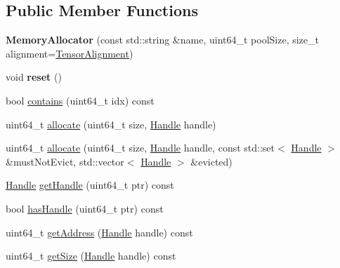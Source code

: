 \subsection*{Public Member Functions}
\begin{DoxyCompactItemize}
\item 
\mbox{\label{classglow_1_1_memory_allocator_ac7c2e3ca37155e4266b2f7104dc9aeab}} 
{\bfseries Memory\+Allocator} (const std\+::string \&name, uint64\+\_\+t pool\+Size, size\+\_\+t alignment=\hyperlink{namespaceglow_ad1e03f233498b5c733d2c0a68ffe2d57}{Tensor\+Alignment})
\item 
\mbox{\label{classglow_1_1_memory_allocator_a3217f7c2173403554b5f53c1eccb269b}} 
void {\bfseries reset} ()
\item 
bool \hyperlink{classglow_1_1_memory_allocator_a10a5be96f3d1ec9d09c911c841db3909}{contains} (uint64\+\_\+t idx) const
\item 
uint64\+\_\+t \hyperlink{classglow_1_1_memory_allocator_a8bd7c15304cb54909cbba8878ea57f7b}{allocate} (uint64\+\_\+t size, \hyperlink{classglow_1_1_memory_allocator_a8ebc21e1c9250f73f2e85aca3ae4ae9d}{Handle} handle)
\item 
uint64\+\_\+t \hyperlink{classglow_1_1_memory_allocator_a10636a2d9429529641393c60a8f2e4d5}{allocate} (uint64\+\_\+t size, \hyperlink{classglow_1_1_memory_allocator_a8ebc21e1c9250f73f2e85aca3ae4ae9d}{Handle} handle, const std\+::set$<$ \hyperlink{classglow_1_1_memory_allocator_a8ebc21e1c9250f73f2e85aca3ae4ae9d}{Handle} $>$ \&must\+Not\+Evict, std\+::vector$<$ \hyperlink{classglow_1_1_memory_allocator_a8ebc21e1c9250f73f2e85aca3ae4ae9d}{Handle} $>$ \&evicted)
\item 
\hyperlink{classglow_1_1_memory_allocator_a8ebc21e1c9250f73f2e85aca3ae4ae9d}{Handle} \hyperlink{classglow_1_1_memory_allocator_ab5938e2f0d2b448f0c2e11dad152ef8a}{get\+Handle} (uint64\+\_\+t ptr) const
\item 
bool \hyperlink{classglow_1_1_memory_allocator_a8148e0d8a4e2e2db2d3a01022a8ceaad}{has\+Handle} (uint64\+\_\+t ptr) const
\item 
uint64\+\_\+t \hyperlink{classglow_1_1_memory_allocator_a3bb026995b47d35fdb5dd4193249e705}{get\+Address} (\hyperlink{classglow_1_1_memory_allocator_a8ebc21e1c9250f73f2e85aca3ae4ae9d}{Handle} handle) const
\item 
uint64\+\_\+t \hyperlink{classglow_1_1_memory_allocator_a8357f913799b90d5c2279ac863f5a8c8}{get\+Size} (\hyperlink{classglow_1_1_memory_allocator_a8ebc21e1c9250f73f2e85aca3ae4ae9d}{Handle} handle) const

\end{DoxyCompactItemize}
